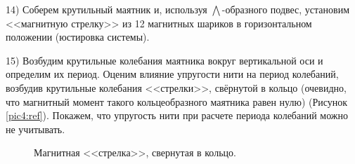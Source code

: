 \documentclass[a4paper,12pt]{article} %
\begin{document}
14) Соберем крутильный маятник и, используя $\bigwedge$-образного подвес, установим <<магнитную стрелку>> из 12 магнитных шариков в горизонтальном положении (юстировка системы).

15) Возбудим крутильные колебания маятника вокруг вертикальной оси и определим их период. Оценим влияние упругости нити на период колебаний, возбудив крутильные колебания <<стрелки>>, свёрнутой в кольцо (очевидно, что магнитный момент такого кольцеобразного маятника равен нулю) (Рисунок \eqref{pic4:ref}). Покажем, что упругость нити при расчете периода колебаний можно не учитывать.

\begin{figure}[H]
\noindent{}
\caption{Магнитная <<стрелка>>, свернутая в кольцо.}
\label{pic4:ref}
\end{figure}
\end{document}
